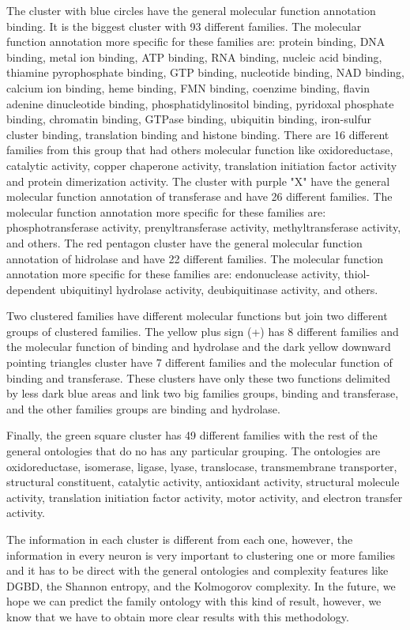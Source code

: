 \documentclass[preprint,12pt]{elsarticle}
\begin{document}
The cluster with blue circles have the general molecular function annotation binding. It is the biggest cluster with 93 different families. The molecular function annotation more specific for these families are: protein binding, DNA binding, metal ion binding, ATP binding, RNA binding, nucleic acid binding, thiamine pyrophosphate binding, GTP binding, nucleotide binding, NAD binding, calcium ion binding, heme binding, FMN binding, coenzime binding, flavin adenine dinucleotide binding, phosphatidylinositol binding, pyridoxal phosphate binding, chromatin binding, GTPase binding, ubiquitin binding, iron-sulfur cluster binding, translation binding and histone binding. There are 16 different families from this group that had others molecular function like oxidoreductase, catalytic activity, copper chaperone activity, translation initiation factor activity and protein dimerization activity. The cluster with purple "X" have the general molecular function annotation of transferase and have 26 different families. The molecular function annotation more specific for these families are: phosphotransferase activity, prenyltransferase activity, methyltransferase activity, and others. The red pentagon cluster have the general molecular function annotation of hidrolase and have 22 different families. The molecular function annotation more specific for these families are: endonuclease activity, thiol-dependent ubiquitinyl hydrolase activity, deubiquitinase activity, and others. \par Two clustered families have different molecular functions but join two different groups of clustered families. The yellow plus sign (+) has 8 different families and the molecular function of binding and hydrolase and the dark yellow downward pointing triangles cluster have 7 different families and the molecular function of binding and transferase. These clusters have only these two functions delimited by less dark blue areas and link two big families groups, binding and transferase, and the other families groups are binding and hydrolase. \par Finally, the green square cluster has 49 different families with the rest of the general ontologies that do no has any particular grouping. The ontologies are oxidoreductase, isomerase, ligase, lyase, translocase, transmembrane transporter, structural constituent, catalytic activity, antioxidant activity, structural molecule activity, translation initiation factor activity, motor activity, and electron transfer activity. \par The information in each cluster is different from each one, however, the information in every neuron is very important to clustering one or more families and it has to be direct with the general ontologies and complexity features like DGBD, the Shannon entropy, and the Kolmogorov complexity. In the future, we hope we can predict the family ontology with this kind of result, however, we know that we have to obtain more clear results with this methodology.  
\end{document}
